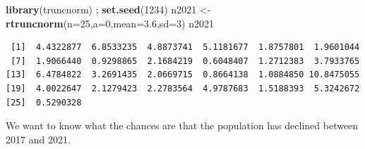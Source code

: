 \documentclass[
]{book}
\newenvironment{Shaded}{\begin{snugshade}}{\end{snugshade}}
\newcommand{\DataTypeTok}[1]{\textcolor[rgb]{0.13,0.29,0.53}{#1}}
\newcommand{\DecValTok}[1]{\textcolor[rgb]{0.00,0.00,0.81}{#1}}
\newcommand{\FloatTok}[1]{\textcolor[rgb]{0.00,0.00,0.81}{#1}}
\newcommand{\KeywordTok}[1]{\textcolor[rgb]{0.13,0.29,0.53}{\textbf{#1}}}
\newcommand{\NormalTok}[1]{#1}
\newcommand{\OperatorTok}[1]{\textcolor[rgb]{0.81,0.36,0.00}{\textbf{#1}}}
\newcommand{\StringTok}[1]{\textcolor[rgb]{0.31,0.60,0.02}{#1}}
\begin{document}
\begin{Shaded}
\begin{Highlighting}[]
\KeywordTok{library}\NormalTok{(truncnorm) ; }\KeywordTok{set.seed}\NormalTok{(}\DecValTok{1234}\NormalTok{)}
\NormalTok{n2021 <-}\StringTok{ }\KeywordTok{rtruncnorm}\NormalTok{(}\DataTypeTok{n=}\DecValTok{25}\NormalTok{,}\DataTypeTok{a=}\DecValTok{0}\NormalTok{,}\DataTypeTok{mean=}\FloatTok{3.6}\NormalTok{,}\DataTypeTok{sd=}\DecValTok{3}\NormalTok{)}
\NormalTok{n2021}
\end{Highlighting}
\end{Shaded}

\begin{verbatim}
 [1]  4.4322877  6.8533235  4.8873741  5.1181677  1.8757801  1.9601044
 [7]  1.9066440  0.9298865  2.1684219  0.6048407  1.2712383  3.7933765
[13]  6.4784822  3.2691435  2.0669715  0.8664138  1.0884850 10.8475055
[19]  4.0022647  2.1279423  2.2783564  4.9787683  1.5188393  5.3242672
[25]  0.5290328
\end{verbatim}

We want to know what the chances are that the population has declined between 2017 and 2021.

\begin{Shaded}
\end{Shaded}
\end{document}
